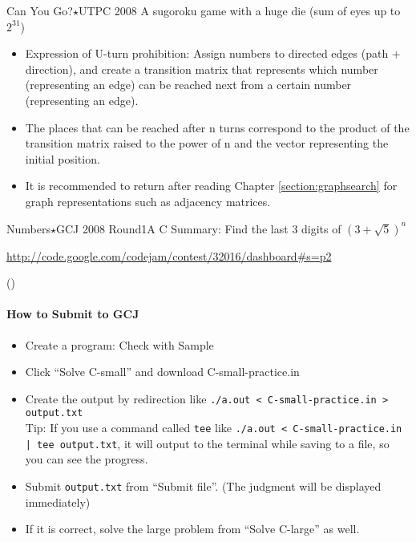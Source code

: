 \begin{pbox}{Can You Go?$\star$}{UTPC 2008}
   A sugoroku game with a huge die (sum of eyes up to $2^{31}$)

\end{pbox}

\begin{itemize}
\setlength{\itemsep}{0pt}
\item Expression of U-turn prohibition: Assign numbers to directed edges (path + direction), and create a transition matrix that represents which number (representing an edge) can be reached next from a certain number (representing an edge).
\item The places that can be reached after n turns correspond to the product of the transition matrix raised to the power of n and the vector representing the initial position.
\item It is recommended to return after reading Chapter \ref{section:graphsearch} for graph representations such as adjacency matrices.
\end{itemize}

\begin{pbox}{Numbers$\star$}{GCJ 2008 Round1A C}
Summary: Find the last 3 digits of $(3+\sqrt{5})^n$

\url{http://code.google.com/codejam/contest/32016/dashboard#s=p2}
\end{pbox}

(\pccbook[p.~239])

\paragraph{How to Submit to GCJ}
\begin{itemize}
\setlength{\itemsep}{0pt}
\item Create a program: Check with Sample
\item Click ``Solve C-small'' and download C-small-practice.in
\item Create the output by redirection like \texttt{./a.out < C-small-practice.in > output.txt}\\
  Tip: If you use a command called \texttt{tee} like \texttt{./a.out < C-small-practice.in | tee output.txt}, it will output to the terminal while saving to a file, so you can see the progress.
\item Submit \texttt{output.txt} from ``Submit file''. (The judgment will be displayed immediately)
\item If it is correct, solve the large problem from ``Solve C-large'' as well.
\end{itemize}


